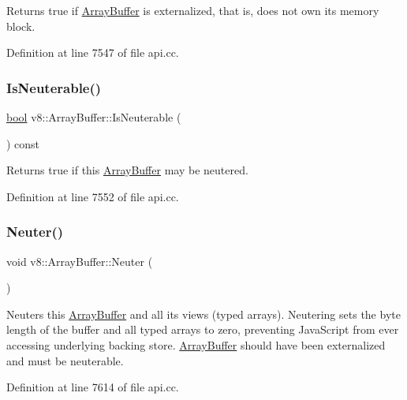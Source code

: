 Returns true if \mbox{\hyperlink{classv8_1_1ArrayBuffer}{Array\+Buffer}} is externalized, that is, does not own its memory block. 

Definition at line 7547 of file api.\+cc.

\mbox{\label{classv8_1_1ArrayBuffer_a5de3f4c29744bd89204462f987ecb626}} 
\subsubsection{\texorpdfstring{Is\+Neuterable()}{IsNeuterable()}}
{\footnotesize\ttfamily \mbox{\hyperlink{classbool}{bool}} v8\+::\+Array\+Buffer\+::\+Is\+Neuterable (\begin{DoxyParamCaption}{ }\end{DoxyParamCaption}) const}

Returns true if this \mbox{\hyperlink{classv8_1_1ArrayBuffer}{Array\+Buffer}} may be neutered. 

Definition at line 7552 of file api.\+cc.

\mbox{\label{classv8_1_1ArrayBuffer_a3420f7d38a8fe20e8f40fb82e6acb325}} 
\subsubsection{\texorpdfstring{Neuter()}{Neuter()}}
{\footnotesize\ttfamily void v8\+::\+Array\+Buffer\+::\+Neuter (\begin{DoxyParamCaption}{ }\end{DoxyParamCaption})}

Neuters this \mbox{\hyperlink{classv8_1_1ArrayBuffer}{Array\+Buffer}} and all its views (typed arrays). Neutering sets the byte length of the buffer and all typed arrays to zero, preventing Java\+Script from ever accessing underlying backing store. \mbox{\hyperlink{classv8_1_1ArrayBuffer}{Array\+Buffer}} should have been externalized and must be neuterable. 

Definition at line 7614 of file api.\+cc.

\mbox{\label{classv8_1_1ArrayBuffer_a28e84424cddbe397f3ee3d920189bc04}} 
